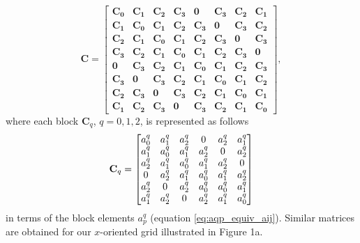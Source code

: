 \documentclass[manuscript,revised]{geophysics}
\begin{document}
\begin{equation}
\mathbf{C} =
\begin{bmatrix}
	\mathbf{C_{0}} & \mathbf{C_{1}} & \mathbf{C_{2}} & \mathbf{C_{3}} & \mathbf{0}     & \mathbf{C_{3}} & \mathbf{C_{2}} & \mathbf{C_{1}} \\
	\mathbf{C_{1}} & \mathbf{C_{0}} & \mathbf{C_{1}} & \mathbf{C_{2}} & \mathbf{C_{3}} & \mathbf{0}     & \mathbf{C_{3}} & \mathbf{C_{2}} \\
	\mathbf{C_{2}} & \mathbf{C_{1}} & \mathbf{C_{0}} & \mathbf{C_{1}} & \mathbf{C_{2}} & \mathbf{C_{3}} & \mathbf{0}     & \mathbf{C_{3}} \\
	\mathbf{C_{3}} & \mathbf{C_{2}} & \mathbf{C_{1}} & \mathbf{C_{0}} & \mathbf{C_{1}} & \mathbf{C_{2}} & \mathbf{C_{3}} & \mathbf{0}     \\
	\mathbf{0}     & \mathbf{C_{3}} & \mathbf{C_{2}} & \mathbf{C_{1}} & \mathbf{C_{0}} & \mathbf{C_{1}} & \mathbf{C_{2}} & \mathbf{C_{3}} \\
	\mathbf{C_{3}} & \mathbf{0}     & \mathbf{C_{3}} & \mathbf{C_{2}} & \mathbf{C_{1}} & \mathbf{C_{0}} & \mathbf{C_{1}} & \mathbf{C_{2}} \\
	\mathbf{C_{2}} & \mathbf{C_{3}} & \mathbf{0}     & \mathbf{C_{3}} & \mathbf{C_{2}} & \mathbf{C_{1}} & \mathbf{C_{0}} & \mathbf{C_{1}} \\
	\mathbf{C_{1}} & \mathbf{C_{2}} & \mathbf{C_{3}} & \mathbf{0}     & \mathbf{C_{3}} & \mathbf{C_{2}} & \mathbf{C_{1}} & \mathbf{C_{0}}
\end{bmatrix},
\label{eq:C-y-oriented}
\end{equation}
where each block $\mathbf{C}_{q}$, $q = 0, 1, 2$, is represented as follows 
\begin{equation}
\tensor{C}_{q} =
\begin{bmatrix}
	a^{q}_{0} & a^{q}_{1} & a^{q}_{2} & 0         & a^{q}_{2} & a^{q}_{1} \\
	a^{q}_{1} & a^{q}_{0} & a^{q}_{1} & a^{q}_{2} & 0         & a^{q}_{2} \\
	a^{q}_{2} & a^{q}_{1} & a^{q}_{0} & a^{q}_{1} & a^{q}_{2} & 0         \\
	0         & a^{q}_{2} & a^{q}_{1} & a^{q}_{0} & a^{q}_{1} & a^{q}_{2} \\
	a^{q}_{2} & 0         & a^{q}_{2} & a^{q}_{0} & a^{q}_{0} & a^{q}_{1} \\
	a^{q}_{1} & a^{q}_{2} & 0         & a^{q}_{2} & a^{q}_{1} & a^{q}_{0}
\end{bmatrix}
\label{eq:Cq-y-oriented}
\end{equation}
in terms of the block elements $a^{q}_{p}$ (equation \ref{eq:aqp_equiv_aij}).
Similar matrices are obtained for our $x$-oriented grid illustrated in Figure 1a.
\end{document}
